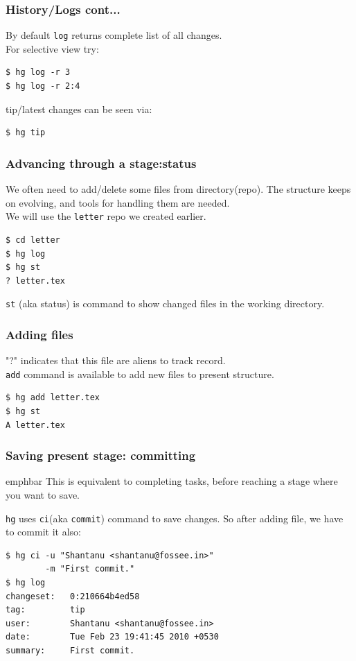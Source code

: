 \documentclass[14pt,compress]{beamer}
\newcommand{\emphbar}[1]
{\begin{beamercolorbox}[rounded=true]{emphbar} 
      {#1}
 \end{beamercolorbox}
}
\newcounter{time}
\newcommand{\inctime}[1]{\addtocounter{time}{#1}{\tiny \thetime\ m}}
\newcommand{\typ}[1]{\lstinline{#1}}
\begin{document}

\begin{frame}[fragile]
  \frametitle{History/Logs cont...}
  By default \typ{log} returns complete list of all changes. \\
  For selective view try:
\begin{lstlisting}
$ hg log -r 3
$ hg log -r 2:4
\end{lstlisting}
  tip/latest changes can be seen via:
  \begin{lstlisting}
$ hg tip    
  \end{lstlisting} %
  \inctime{5}
\end{frame}

\begin{frame}[fragile]
  \frametitle{Advancing through a stage:status}
  We often need to add/delete some files from directory(repo). The structure keeps on evolving, and tools for handling them are needed.\\
  We will use the \typ{letter} repo we created earlier.
  \begin{lstlisting}
$ cd letter
$ hg log
$ hg st
? letter.tex
  \end{lstlisting} %
  \alert{\typ{st}} (aka status) is command to show changed files in the working directory.\\
\end{frame}

\begin{frame}[fragile]
  \frametitle{Adding files}
  "?" indicates that this file are aliens to track record.\\
  \alert{\typ{add}} command is available to add new files to present structure.
  \begin{lstlisting}
$ hg add letter.tex
$ hg st
A letter.tex
  \end{lstlisting}
\end{frame}

\begin{frame}[fragile]
  \frametitle{Saving present stage: committing}
  \emphbar{This is equivalent to completing tasks, before reaching a stage where you want to save.}
  \typ{hg} uses \alert{\typ{ci}}(aka \typ{commit}) command to save changes. So after adding file, we have to commit it also:
  \begin{lstlisting}
$ hg ci -u "Shantanu <shantanu@fossee.in>" 
        -m "First commit."
$ hg log
changeset:   0:210664b4ed58
tag:         tip
user:        Shantanu <shantanu@fossee.in>
date:        Tue Feb 23 19:41:45 2010 +0530
summary:     First commit.
  \end{lstlisting}
\end{frame}
\end{document}
